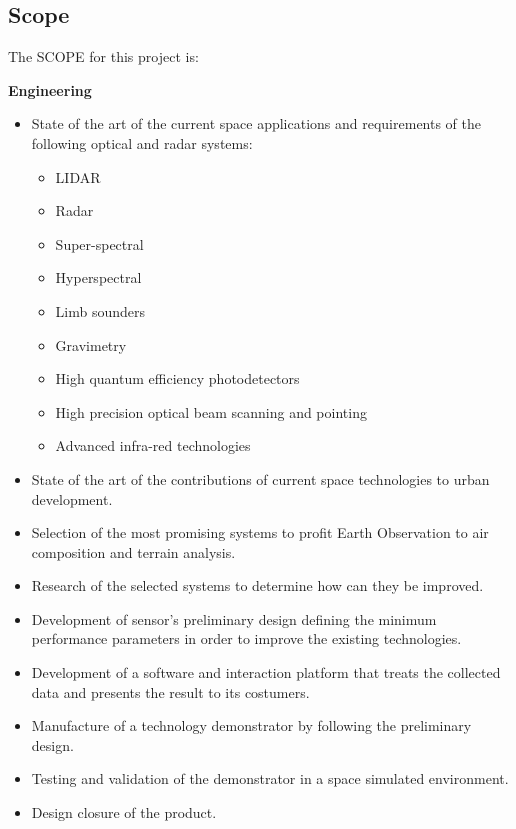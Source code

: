 \subsection{Scope}


The SCOPE for this project is:

{\bfseries Engineering} 
\begin{itemize}

	\item State of the art of the current space applications and requirements of the following optical and radar systems:

		\begin{itemize}

		\item LIDAR
		\item Radar
		\item Super-spectral
		\item Hyperspectral
		\item Limb sounders
		\item Gravimetry
		\item High quantum efficiency photodetectors
		\item High precision optical beam scanning and pointing
		\item Advanced infra-red technologies

		\end{itemize}

	\item State of the art of the contributions of current space technologies to urban development.

	\item Selection of the most promising systems to profit Earth Observation to air composition and terrain analysis.
	
	\item Research of the selected systems to determine how can they be improved. 
	
	\item Development of sensor's preliminary design defining the minimum performance parameters in order to improve the existing technologies.

	\item Development of a software and interaction platform that treats the collected data and presents the result to its costumers. 

	\item Manufacture of a technology demonstrator by following the preliminary design.

	\item Testing and validation of the demonstrator in a space simulated environment.

	\item Design closure of the product.

\end{itemize}

